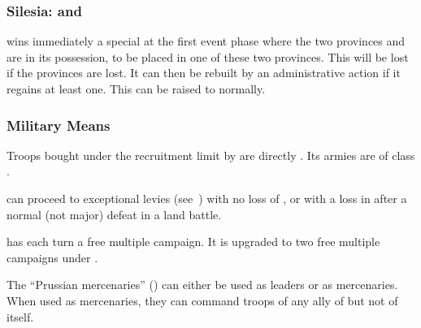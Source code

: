 \subsubsection{Silesia: 
  and }
\aparag \PRU wins immediately a special \MNU\facemoins at the first
event phase where the two provinces  and
 are in its possession, to be placed in one of these
two provinces.
\bparag This \MNU will be lost if the provinces are lost. It can then be
rebuilt by an administrative action if it regains at least one.
\bparag This \MNU can be raised to \Faceplus normally.

\subsubsection{Military Means}\label{chSpecific:Prussia:Military Means}
\aparag Troops bought under the recruitment limit by \PRU are directly
. Its armies are of class \CAIV.

\aparag \PRU can proceed to exceptional levies
(see~) with no loss of \STAB,
or with a loss in \STAB after a normal (not major) defeat in a land battle.

\aparag \PRU has each turn a free multiple campaign. It is upgraded to
two free multiple campaigns under .

 The ``Prussian mercenaries''
() can either be used as \PRU
leaders or as mercenaries.
\bparag When used as mercenaries, they can command troops of any ally
of \PRU but not of \PRU itself.



